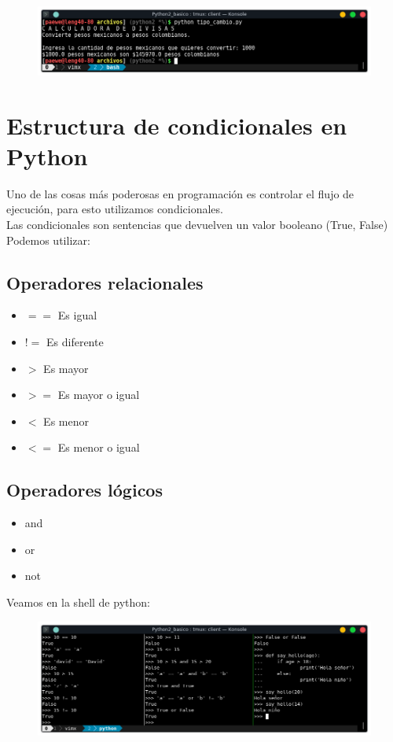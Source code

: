 \documentclass{article}
\begin{document}
\newpage

\begin{figure}[h!]
  \centering
  \includegraphics[scale=0.75]{./Pictures/024_funcion_tipo_cambio.png}
\end{figure}


\section{Estructura de condicionales en Python}%
Uno de las cosas más poderosas en programación es controlar el flujo de
ejecución, para esto utilizamos condicionales.\\

Las condicionales son sentencias que devuelven un valor booleano (True, False)\\

Podemos utilizar:

\subsection{Operadores relacionales}%
\begin{itemize}
  \item $==$ Es igual
  \item $!=$ Es diferente
  \item $>$ Es mayor
  \item $>=$ Es mayor o igual
  \item $<$ Es menor
  \item $<=$ Es menor o igual
\end{itemize}

\subsection{Operadores lógicos}%
\begin{itemize}
  \item and
  \item or
  \item not
\end{itemize}

Veamos en la shell de python:

\begin{figure}[h!]
  \centering
  \includegraphics[scale=0.75]{./Pictures/025_relaciones_y_condicionales.png}
\end{figure}
\end{document}
